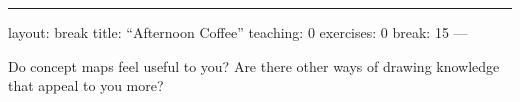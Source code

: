 \begin{center}
\rule{3in}{0.4pt}
\end{center}
layout: break
title: ``Afternoon Coffee''
teaching: 0
exercises: 0
break: 15
---

Do concept maps feel useful to you?
Are there other ways of drawing knowledge that appeal to you more?

